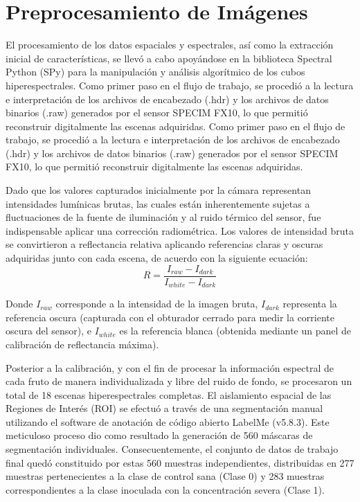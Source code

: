 \section{Preprocesamiento de Imágenes}
El procesamiento de los datos espaciales y espectrales, así como la extracción inicial de características, se llevó a cabo apoyándose en la biblioteca Spectral Python (SPy) para la manipulación y análisis algorítmico de los cubos hiperespectrales. Como primer paso en el flujo de trabajo, se procedió a la lectura e interpretación de los archivos de encabezado (.hdr) y los archivos de datos binarios (.raw) generados por el sensor SPECIM FX10, lo que permitió reconstruir digitalmente las escenas adquiridas.
Como primer paso en el flujo de trabajo, se procedió a la lectura e interpretación de los archivos de encabezado (.hdr) y los archivos de datos binarios (.raw) generados por el sensor SPECIM FX10, lo que permitió reconstruir digitalmente las escenas adquiridas.

Dado que los valores capturados inicialmente por la cámara representan intensidades lumínicas brutas, las cuales están inherentemente sujetas a fluctuaciones de la fuente de iluminación y al ruido térmico del sensor, fue indispensable aplicar una corrección radiométrica. Los valores de intensidad bruta se convirtieron a reflectancia relativa aplicando referencias claras y oscuras adquiridas junto con cada escena, de acuerdo con la siguiente ecuación\cite{morales_laboratory_2022}:
\begin{equation}
    R=\dfrac{I_{raw}-I_{dark}}{I_{white}-I_{dark}}
\end{equation}

Donde $I_{raw}$ corresponde a la intensidad de la imagen bruta, $I_{dark}$ representa la referencia oscura (capturada con el obturador cerrado para medir la corriente oscura del sensor), e $I_{white}$ es la referencia blanca (obtenida mediante un panel de calibración de reflectancia máxima).

Posterior a la calibración, y con el fin de procesar la información espectral de cada fruto de manera individualizada y libre del ruido de fondo, se procesaron un total de 18 escenas hiperespectrales completas. El aislamiento espacial de las Regiones de Interés (ROI) se efectuó a través de una segmentación manual utilizando el software de anotación de código abierto LabelMe (v5.8.3)\cite{wada_wkentarolabelme_2021}.
Este meticuloso proceso dio como resultado la generación de 560 máscaras de segmentación individuales. Consecuentemente, el conjunto de datos de trabajo final quedó constituido por estas 560 muestras independientes, distribuidas en 277 muestras pertenecientes a la clase de control sana (Clase 0) y 283 muestras correspondientes a la clase inoculada con la concentración severa (Clase 1).

